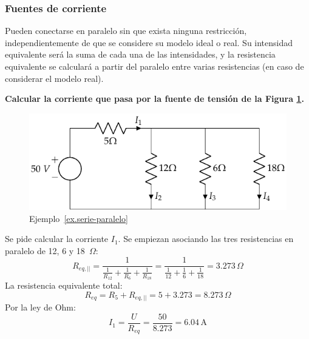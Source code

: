\documentclass[11pt]{book} %
\begin{document}
		\subsubsection{Fuentes de corriente}
		
		Pueden conectarse en paralelo sin que exista ninguna restricción, independientemente de que se considere su modelo ideal o real. Su intensidad equivalente será la suma de cada una de las intensidades, y la resistencia equivalente se calculará a partir del paralelo entre varias resistencias (en caso de considerar el modelo real).
	
	
	\begin{example}\label{ex.serie-paralelo}
	    \textbf{Calcular la corriente que pasa por la fuente de tensión de la Figura \ref{fig.ejercicio1_tema1}.}
		\begin{figure}[H]
			\centering
			\includegraphics{../figs/ej1_BT1.pdf}
			\caption{Ejemplo~\ref{ex.serie-paralelo}}
			\label{fig.ejercicio1_tema1}
		\end{figure}
		
		Se pide calcular la corriente $I_1$. Se empiezan asociando las tres resistencias en paralelo de 12, 6 y 18~$\Omega$:
\begin{equation*}
    R_{eq,||}=\dfrac{1}{\frac{1}{R_{12}}+\frac{1}{R_{6}}+\frac{1}{R_{18}}}=\dfrac{1}{\frac{1}{12}+\frac{1}{6}+\frac{1}{18}}=3.273\,\Omega
\end{equation*}
La resistencia equivalente total:
\begin{equation*}
    R_{eq}=R_5+R_{eq,||}=5+3.273=8.273\,\Omega
\end{equation*}
Por la ley de Ohm: 
\begin{equation*}
    I_1=\dfrac{U}{R_{eq}}=\dfrac{50}{8.273}={6.04\,\text{A}}
\end{equation*}
	\end{example}
	
	
	
\end{document}
